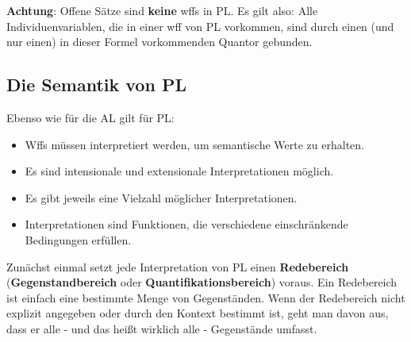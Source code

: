 \documentclass{scrartcl}
\begin{document}
\textbf{Achtung}: Offene Sätze sind \textbf{keine} wffs in PL. Es gilt also: Alle Individuenvariablen, die in einer wff von PL vorkommen, sind durch einen (und nur einen) in dieser Formel vorkommenden Quantor gebunden.

\subsection{Die Semantik von PL}

Ebenso wie für die AL gilt für PL:
\begin{itemize}
	\item Wffs müssen interpretiert werden, um semantische Werte zu erhalten.
	\item Es sind intensionale und extensionale Interpretationen möglich.
	\item Es gibt jeweils eine Vielzahl möglicher Interpretationen.
	\item Interpretationen sind Funktionen, die verschiedene einschränkende Bedingungen erfüllen.
\end{itemize}

Zunächst einmal setzt jede Interpretation von PL einen \textbf{Redebereich} (\textbf{Gegenstandbereich} oder \textbf{Quantifikationsbereich}) voraus. Ein Redebereich ist einfach eine bestimmte Menge von Gegenständen. Wenn der Redebereich nicht explizit angegeben oder durch den Kontext bestimmt ist, geht man davon aus, dass er alle - und das heißt wirklich alle - Gegenstände umfasst. \\
\end{document}
